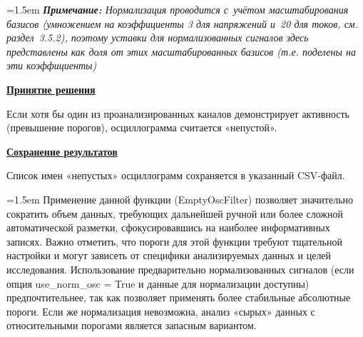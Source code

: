 {\emergencystretch=1.5em \textit{\textbf{Примечание:} Нормализация проводится с~учётом масштабирования базисов (умножением на коэффициенты 3 для напряжений и~20 для токов, см. раздел~3.5.2), поэтому уставки для нормализованных сигналов здесь представлены как доля от этих масштабированных базисов (т.е. поделены на эти коэффициенты)}\par}


\noindent\textbf{\underline{Принятие решения}}\par\vspace{0.1cm}

Если хотя бы один из проанализированных каналов демонстрирует активность (превышение
порогов), осциллограмма считается «непустой».

\noindent\textbf{\underline{Сохранение результатов}}\par\vspace{0.1cm}

Список имен «непустых» осциллограмм сохраняется в указанный CSV-файл.

{\emergencystretch=1.5em Применение данной функции (EmptyOscFilter) позволяет значительно сократить объем данных, требующих дальнейшей ручной или более сложной автоматической разметки, сфокусировавшись на наиболее информативных записях. Важно отметить, что пороги для этой функции требуют тщательной настройки и могут зависеть от специфики анализируемых данных и целей исследования. Использование предварительно нормализованных сигналов (если опция use\_\allowbreak norm\_\allowbreak osc = True и данные для нормализации доступны) предпочтительнее, так как позволяет применять более стабильные абсолютные пороги. Если же нормализация невозможна, анализ «сырых» данных с относительными порогами является запасным вариантом.\par}

\clearpage
